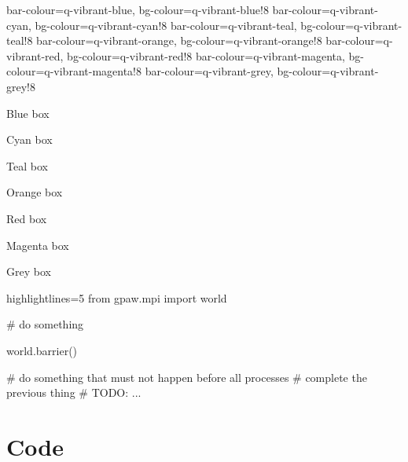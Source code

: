  { bar-colour=q-vibrant-blue, bg-colour=q-vibrant-blue!8 }
 { bar-colour=q-vibrant-cyan, bg-colour=q-vibrant-cyan!8 }
 { bar-colour=q-vibrant-teal, bg-colour=q-vibrant-teal!8 }
 { bar-colour=q-vibrant-orange, bg-colour=q-vibrant-orange!8 }
 { bar-colour=q-vibrant-red, bg-colour=q-vibrant-red!8 }
 { bar-colour=q-vibrant-magenta, bg-colour=q-vibrant-magenta!8 }
 { bar-colour=q-vibrant-grey, bg-colour=q-vibrant-grey!8 }
\begin{bluebox} Blue box \end{bluebox}
\begin{cyanbox} Cyan box \end{cyanbox}
\begin{tealbox} Teal box \end{tealbox}
\begin{orangebox} Orange box \end{orangebox}
\begin{redbox} Red box \end{redbox}
\begin{magentabox} Magenta box \end{magentabox}
\begin{greybox} Grey box \end{greybox}

\begin{shortpycode*}{highlightlines={5}}
  from gpaw.mpi import world
  
  # do something

  world.barrier()

  # do something that must not happen before all processes
  # complete the previous thing
  # TODO: ...
\end{shortpycode*}

\section{Code}

